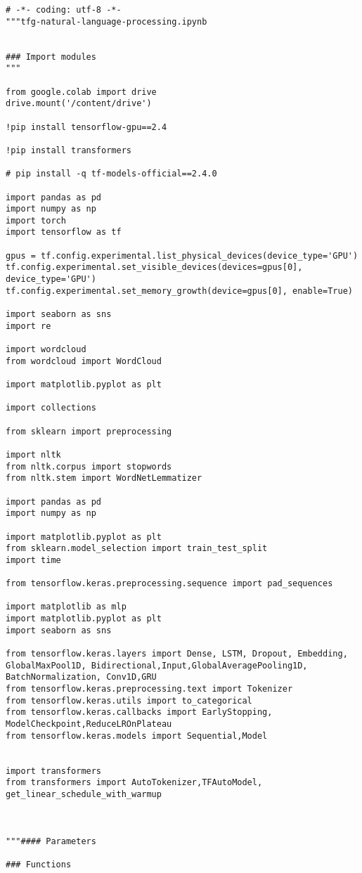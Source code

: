 \documentclass[10pt,riqno,a4paper,twoside]{article}\usepackage[]{graphicx}\usepackage[]{color}
\begin{document}
\begin{lstlisting}
# -*- coding: utf-8 -*-
"""tfg-natural-language-processing.ipynb


### Import modules
"""

from google.colab import drive
drive.mount('/content/drive')

!pip install tensorflow-gpu==2.4

!pip install transformers

# pip install -q tf-models-official==2.4.0

import pandas as pd
import numpy as np
import torch
import tensorflow as tf

gpus = tf.config.experimental.list_physical_devices(device_type='GPU')
tf.config.experimental.set_visible_devices(devices=gpus[0], device_type='GPU')
tf.config.experimental.set_memory_growth(device=gpus[0], enable=True)

import seaborn as sns
import re

import wordcloud
from wordcloud import WordCloud

import matplotlib.pyplot as plt

import collections

from sklearn import preprocessing

import nltk
from nltk.corpus import stopwords
from nltk.stem import WordNetLemmatizer

import pandas as pd
import numpy as np

import matplotlib.pyplot as plt
from sklearn.model_selection import train_test_split
import time

from tensorflow.keras.preprocessing.sequence import pad_sequences

import matplotlib as mlp
import matplotlib.pyplot as plt
import seaborn as sns

from tensorflow.keras.layers import Dense, LSTM, Dropout, Embedding, GlobalMaxPool1D, Bidirectional,Input,GlobalAveragePooling1D, BatchNormalization, Conv1D,GRU
from tensorflow.keras.preprocessing.text import Tokenizer
from tensorflow.keras.utils import to_categorical
from tensorflow.keras.callbacks import EarlyStopping, ModelCheckpoint,ReduceLROnPlateau
from tensorflow.keras.models import Sequential,Model


import transformers
from transformers import AutoTokenizer,TFAutoModel, get_linear_schedule_with_warmup



"""#### Parameters

### Functions


\end{lstlisting}
\end{document}
